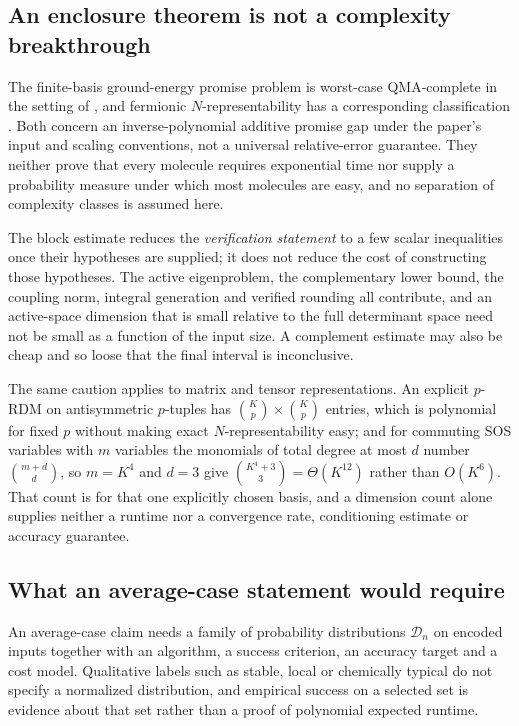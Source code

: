 \subsection{An enclosure theorem is not a complexity breakthrough}
The finite-basis ground-energy promise problem is worst-case QMA-complete in the
setting of \citet{OGorman2022}, and fermionic $N$-representability has a
corresponding classification \citep{Liu2007}. Both concern an inverse-polynomial
additive promise gap under the paper's input and scaling conventions, not a
universal relative-error guarantee. They neither prove that every molecule
requires exponential time nor supply a probability measure under which most
molecules are easy, and no separation of complexity classes is assumed here.

The block estimate reduces the \emph{verification statement} to a few scalar
inequalities once their hypotheses are supplied; it does not reduce the cost of
constructing those hypotheses. The active eigenproblem, the complementary lower
bound, the coupling norm, integral generation and verified rounding all
contribute, and an active-space dimension that is small relative to the full
determinant space need not be small as a function of the input size. A complement
estimate may also be cheap and so loose that the final interval is
inconclusive.

The same caution applies to matrix and tensor representations. An explicit
$p$-RDM on antisymmetric $p$-tuples has $\binom Kp\times\binom Kp$ entries,
which is polynomial for fixed $p$ without making exact $N$-representability
easy; and for commuting SOS variables with $m$ variables the monomials of total
degree at most $d$ number $\binom{m+d}{d}$, so $m=K^{4}$ and $d=3$ give
$\binom{K^{4}+3}{3}=\Theta(K^{12})$ rather than $O(K^{6})$. That count is for
that one explicitly chosen basis, and a dimension count alone supplies neither a
runtime nor a convergence rate, conditioning estimate or accuracy guarantee.

\subsection{What an average-case statement would require}
An average-case claim needs a family of probability distributions
$\mathcal D_n$ on encoded inputs together with an algorithm, a success
criterion, an accuracy target and a cost model. Qualitative labels such as
stable, local or chemically typical do not specify a normalized distribution,
and empirical success on a selected set is evidence about that set rather than a
proof of polynomial expected runtime.

